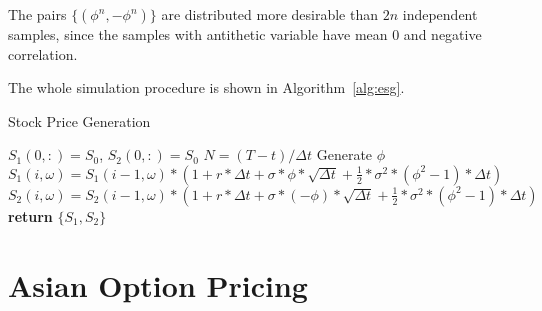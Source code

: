 \documentclass[a4paper,11pt] {article}
\begin{document}
The pairs $\{(\phi^{n},-\phi^{n})\}$ are distributed more desirable than $2n$ independent samples, since the samples with antithetic variable have mean 0 and negative correlation. 

The whole simulation procedure is shown in Algorithm~\ref{alg:esg}.

\begin{algorithm}
\caption{Stock Price Generation}\label{alg:esg}
\begin{algorithmic}[1]
\State $S_1(0,:) = S_0$, $S_2(0,:) = S_0$
\State $N = (T-t)/\Delta t$ 
    
\State Generate $\phi$
\State $S_1(i,\omega)= S_1(i-1,\omega) * (1 + r * \Delta t + \sigma * \phi * \sqrt{\Delta t} + \frac{1}{2} * \sigma^2 *(\phi^2-1)*\Delta t)$
\State $S_2(i,\omega)= S_2(i-1,\omega) * (1 + r * \Delta t + \sigma * (-\phi) * \sqrt{\Delta t} + \frac{1}{2} * \sigma^2 *(\phi^2-1)*\Delta t)$
\EndFor
\EndFor %
\State \textbf{return} $\{S_1, S_2\}$  %
\EndProcedure
\end{algorithmic}
\end{algorithm}

\section{Asian Option Pricing}

%
\end{document}
